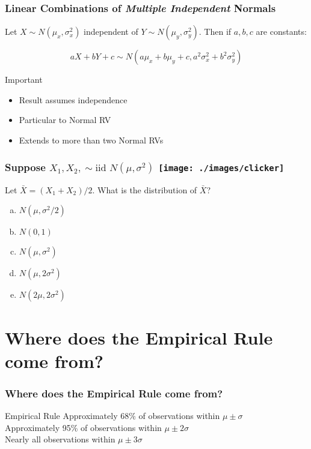 \begin{frame}
  \frametitle{Linear Combinations of \emph{Multiple Independent} Normals}
Let $X \sim N(\mu_x, \sigma^2_x)$ independent of $Y \sim N(\mu_y, \sigma^2_y)$. Then if $a,b,c$ are constants:

$$\boxed{aX + bY +c \sim N(a\mu_x + b\mu_y + c, a^2 \sigma_x^2 + b^2 \sigma_y^2)}$$



\begin{block}{Important}
	\begin{itemize}
		\item Result assumes independence
		\item Particular to Normal RV 
		\item Extends to more than two Normal RVs
	\end{itemize}
\end{block}

\end{frame}
\begin{frame}
\frametitle{Suppose $X_1, X_2, \sim \mbox{iid } N(\mu, \sigma^2)$ \hfill \texttt{[image: ./images/clicker]}}

Let $\bar{X} = (X_1 + X_2)/2$. What is the distribution of $\bar{X}$?
\begin{enumerate}[(a)]
\item $N(\mu, \sigma^2/2)$
\item $N(0,1)$
\item $N(\mu, \sigma^2)$
\item $N(\mu, 2\sigma^2)$
\item $N(2\mu, 2\sigma^2)$
\end{enumerate}

\end{frame}
\section{Where does the Empirical Rule come from?}
\begin{frame}
\frametitle{Where does the Empirical Rule come from?}

\begin{block}{Empirical Rule}
Approximately 68\% of observations within $\mu\pm \sigma$\\
Approximately 95\% of observations within $\mu\pm 2 \sigma$\\
Nearly all observations within $\mu\pm 3 \sigma$
\end{block}
\end{frame}

